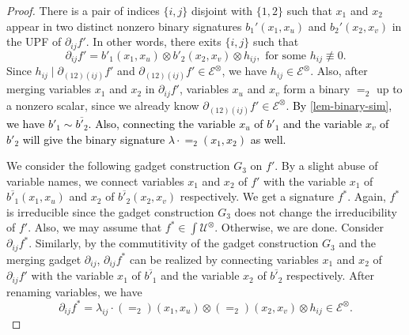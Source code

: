 \begin{proof}
      \vspace{1ex}
      There is a pair of indices $\{i, j\}$ disjoint with $\{1, 2\}$ such that $x_1$ and $x_2$ appear in two distinct nonzero binary signatures ${b_1'}(x_1, x_u)$ and ${b_2'}(x_2, x_v)$ in the UPF of ${\partial}_{ij}{f'}$. 
 In other words, there exits $\{i, j\}$ such that  \begin{equation}
    {\partial}_{ij}{f'}={b'_1}(x_1, x_u)\otimes {b'_2}(x_2, x_v) \otimes {h_{ij}}, \text{ for some } {h_{ij}}\not\equiv 0.
    \end{equation}
    Since ${h_{ij}} \mid {\partial}_{(12)(ij)}{f'}$ and ${\partial}_{(12)(ij)}{f'}\in 
    {\mathcal{E}}^{\otimes}$, we have ${h_{ij}}\in {\mathcal{E}}^{\otimes}$.
    Also, after merging variables $x_1$ and $x_2$ in ${\partial}_{ij}{f'}$, variables $x_u$ and $x_v$ form a binary $=_2$ up to a nonzero scalar, since we already know ${\partial}_{(12)(ij)}{f'}\in 
    {\mathcal{E}}^{\otimes}$. 
    \textcolor{black}{By \cref{lem-binary-sim}, we have ${b'_1} \sim \overline{b'_2}$.
    Also, connecting the variable $x_u$ of ${b'_1}$ and the variable  $x_v$ of ${b'_2}$ will give the binary signature $\lambda \cdot=_{2}(x_1, x_2)$ as well.}
    
    We consider the following gadget construction $G_3$ on ${f'}$.
    By a slight abuse of variable names, 
    we connect variables $x_1$ and $x_2$ of ${f'}$ with the variable $x_1$ of $\overline{b'_1}(x_1,x_u)$ and $x_2$ of $\overline{b'_2}(x_2,x_v)$ respectively. 
    We get a signature ${f^{\ast}}$.
    Again, ${f^{\ast}}$ is irreducible since the gadget construction $G_3$ does not change the irreducibility of ${f'}.$
    Also, we may assume that ${f^{\ast}}\in{\int}{\mathcal{U}}^{\otimes}$.
    Otherwise, we are done.
    Consider ${\partial}_{ij}{f^{\ast}}$.
    Similarly, by the commutitivity of the  gadget construction $G_3$ and the merging gadget ${\partial}_{ij}$, 
    ${\partial}_{ij}{f^{\ast}}$ can be realized by connecting variables $x_1$ and $x_2$ of ${\partial}_{ij}{f'}$ with the variable $x_1$ of $\overline{b'_1}$ and the variable $x_2$ of $\overline{b'_2}$ respectively.
    After renaming variables, we have
    \begin{equation}\label{form_ij}
        {\partial}_{ij}{f^{\ast}}=\lambda_{ij} \cdot (=_2)(x_1, x_u)\otimes (=_2) \left(x_2, x_v\right) \otimes  h_{ij}\in \mathcal{E}^{\otimes}.
    \end{equation}


\end{proof}
